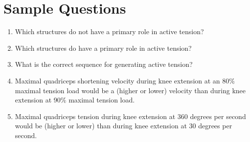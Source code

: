 \printbibliography[heading=subbibintoc]

\section*{Sample Questions}

\begin{enumerate}
    \item Which structures do not have a primary role in active tension?
    \item Which structures do have a primary role in active tension?
    \item What is the correct sequence for generating active tension?
    \item Maximal quadriceps shortening velocity during knee extension at an 80\% maximal tension load would be a (higher or lower) velocity than during knee extension at 90\%  maximal tension load.
    \item Maximal quadriceps tension during knee extension at 360 degrees per second would be (higher or lower) than during knee extension at 30 degrees per second.
\end{enumerate}